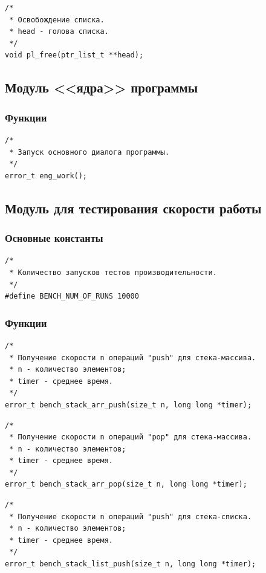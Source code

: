 \documentclass[a4paper,12pt]{extarticle}
\begin{document}
\begin{verbatim}
/*
 * Освобождение списка.
 * head - голова списка.
 */
void pl_free(ptr_list_t **head);
\end{verbatim}

\subsection{Модуль <<ядра>> программы}
\subsubsection{Функции}
\begin{verbatim}
/*
 * Запуск основного диалога программы.
 */
error_t eng_work();
\end{verbatim}

\subsection{Модуль для тестирования скорости работы}
\subsubsection{Основные константы}
\begin{verbatim}
/*
 * Количество запусков тестов производительности.
 */
#define BENCH_NUM_OF_RUNS 10000
\end{verbatim}

\subsubsection{Функции}
\begin{verbatim}
/*
 * Получение скорости n операций "push" для стека-массива.
 * n - количество элементов;
 * timer - среднее время.
 */
error_t bench_stack_arr_push(size_t n, long long *timer);
\end{verbatim}

\begin{verbatim}
/*
 * Получение скорости n операций "pop" для стека-массива.
 * n - количество элементов;
 * timer - среднее время.
 */
error_t bench_stack_arr_pop(size_t n, long long *timer);
\end{verbatim}

\begin{verbatim}
/*
 * Получение скорости n операций "push" для стека-списка.
 * n - количество элементов;
 * timer - среднее время.
 */
error_t bench_stack_list_push(size_t n, long long *timer);
\end{verbatim}
\end{document}
